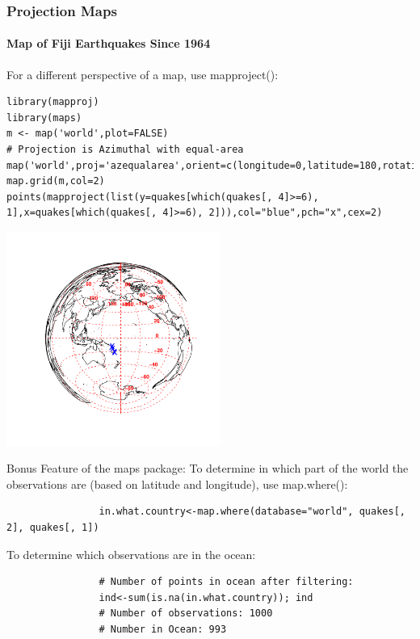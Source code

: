 \begin{frame}
\frametitle{Projection Maps}
  \framesubtitle{Map of Fiji Earthquakes Since 1964}

For a different perspective of a map, use  \ttfamily mapproject(): \normalfont 

\begin{lstlisting}
library(mapproj)
library(maps)
m <- map('world',plot=FALSE)
# Projection is Azimuthal with equal-area
map('world',proj='azequalarea',orient=c(longitude=0,latitude=180,rotation=0))
map.grid(m,col=2)
points(mapproject(list(y=quakes[which(quakes[, 4]>=6), 1],x=quakes[which(quakes[, 4]>=6), 2])),col="blue",pch="x",cex=2)
\end{lstlisting}

\newpage
       \begin{center}
\includegraphics[width = 70mm]{images/Fuji2.pdf}
\end{center}

\end{frame}

\begin{frame}[fragile]
	\begin{alertblock}{Bonus Feature of the \ttfamily maps \normalfont package:}
		To determine in which part of the world the observations are (based on latitude and longitude), use \ttfamily map.where(): \normalfont
			\begin{lstlisting}		
				in.what.country<-map.where(database="world", quakes[, 2], quakes[, 1])
			\end{lstlisting}
		To determine which observations are in the ocean: \normalfont
			\begin{lstlisting}
				# Number of points in ocean after filtering:
				ind<-sum(is.na(in.what.country)); ind
				# Number of observations: 1000
				# Number in Ocean: 993
			\end{lstlisting}
	\end{alertblock}

\end{frame}

